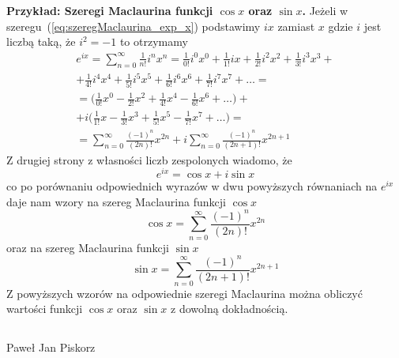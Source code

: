 \documentclass[12pt]{article}
\begin{document}
{\bf Przykład: Szeregi Maclaurina funkcji $\cos x$ oraz $\sin x$.\/}
Jeżeli w szeregu~(\ref{eq:szeregMaclaurina_exp_x}) podstawimy $ix$ zamiast $x$ gdzie $i$ jest liczbą taką, że $i^{2} = -1$ to otrzymamy
\begin{eqnarray}
\label{eq:szeregMaclaurina_exp_ix}
e^{ix} = \sum_{n=0}^{\infty} \frac{1}{n!} i^{n} x^{n}    %
=
\frac{1}{0!} i^{0} x^{0} + \frac{1}{1!} i x + \frac{1}{2!} i^{2} x^{2} + \frac{1}{3!} i^{3} x^{3} +   \\ \nonumber
+
\frac{1}{4!} i^{4} x^{4} + \frac{1}{5!} i^{5} x^{5} + \frac{1}{6!} i^{6} x^{6} + \frac{1}{7!} i^{7} x^{7} + \ldots  =  \\ \nonumber
=
    \Bigg( \frac{1}{0!}       x^{0} - \frac{1}{2!} x^{2} + \frac{1}{4!} x^{4} - \frac{1}{6!} x^{6} +  \ldots \Bigg) +     \\ \nonumber
+ i \Bigg( \frac{1}{1!}       x     - \frac{1}{3!} x^{3} + \frac{1}{5!} x^{5} - \frac{1}{7!} x^{7} +  \ldots \Bigg) =     \\ \nonumber
=
\sum_{n=0}^{\infty} \frac{(-1)^{n}}{(2n)!} x^{2n} + i \sum_{n=0}^{\infty} \frac{(-1)^{n}}{(2n+1)!} x^{2n+1}
\end{eqnarray}
Z drugiej strony z własności liczb zespolonych wiadomo, że
\begin{equation}
\label{eq:exp_ix}
e^{ix} = \cos x + i \sin x
\end{equation}
co po porównaniu odpowiednich wyrazów w dwu powyższych równaniach na $e^{ix}$ daje nam wzory na szereg Maclaurina funkcji $\cos x$
\begin{equation}
\label{eq:cos_x}
\cos x = \sum_{n=0}^{\infty} \frac{(-1)^{n}}{(2n)!} x^{2n}
\end{equation}
oraz na szereg Maclaurina funkcji $\sin x$
\begin{equation}
\label{eq:sin_x}
\sin x = \sum_{n=0}^{\infty} \frac{(-1)^{n}}{(2n+1)!} x^{2n+1}
\end{equation}
Z powyższych wzorów na odpowiednie szeregi Maclaurina można obliczyć wartości funkcji $\cos x$ oraz $\sin x$ z dowolną dokładnością.





\subsection*{}

Paweł Jan Piskorz
\end{document}
